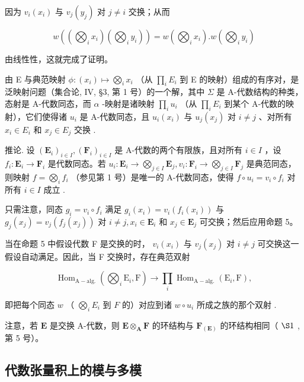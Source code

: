 因为 \(v_{i}(x_{i})\) 与 \(v_{j}(y_{j})\) 对 \(j \neq i\) 交换；从而

\[
w \left(\left(\bigotimes_ {i} x _ {i}\right) \left(\bigotimes_ {i} y _ {i}\right)\right) = w \left(\bigotimes_ {i} x _ {i}\right). w \left(\bigotimes_ {i} y _ {i}\right)
\]

由线性性，这就完成了证明。

由 E 与典范映射 \(\phi: (x_i) \mapsto \bigotimes_i x_i\) （从 \(\prod_i E_i\) 到 E 的映射）组成的有序对，是泛映射问题（集合论, IV, §3, 第 1 号）的一个解，其中 \(\Sigma\) 是 A-代数结构的种类，态射是 A-代数同态，而 \(\alpha\) -映射是诸映射 \(\prod_i u_i\) （从 \(\prod_i E_i\) 到某个 A-代数的映射），它们使得诸 \(u_i\) 是 A-代数同态，且 \(u_i(x_i)\) 与 \(u_j(x_j)\) 对 \(i \neq j\) 、对所有 \(x_i \in E_i\) 和 \(x_j \in E_j\) 交换 .

推论. 设 \((\mathbf{E}_i)_{i\in I}, (\mathbf{F}_i)_{i\in I}\) 是 A-代数的两个有限族，且对所有 \(i\in I\) ，设 \(f_i: \mathbf{E}_i \to \mathbf{F}_i\) 是代数同态。若 \(u_i: \mathbf{E}_i \to \bigotimes_{j\in I} \mathbf{E}_{j}, v_i: \mathbf{F}_i \to \bigotimes_{j\in I} \mathbf{F}_j\) 是典范同态，则映射 \(f = \bigotimes_{i} f_i\) （参见第 1 号）是唯一的 A-代数同态，使得 \(f \circ u_i = v_i \circ f_i\) 对所有 \(i\in I\) 成立 .

只需注意，同态 \(g_{i} = v_{i} \circ f_{i}\) 满足 \(g_{i}(x_{i}) = v_{i}(f_{i}(x_{i}))\) 与 \(g_{j}(x_{j}) = v_{j}(f_{j}(x_{j}))\) 对 \(i \neq j, x_{i} \in \mathbf{E}_{i}\) 和 \(x_{j} \in \mathbf{E}_{j}\) 可交换；然后应用命题 5。

当在命题 5 中假设代数 F 是交换的时， \(v_{i}(x_{i})\) 与 \(v_{j}(x_{j})\) 对 \(i \neq j\) 可交换这一假设自动满足。因此，当 F 交换时，存在典范双射

\[
\operatorname{Hom} _ {\mathrm{A-alg.}} \left(\bigotimes_ {i} \mathrm{E} _ {i}, \mathrm{F}\right)\rightarrow \prod_ {i} \operatorname{Hom} _ {\mathrm{A-alg.}} (\mathrm{E} _ {i}, \mathrm{F}),\tag{6}
\]

即把每个同态 \(w\) （ \(\bigotimes_{i} E_{i}\) 到 \(F\) 的）对应到诸 \(w \circ u_{i}\) 所成之族的那个双射 .

注意，若 \(\mathbf{E}\) 是交换 A-代数，则 \(\mathbf{E} \otimes_{\mathbf{A}} \mathbf{F}\) 的环结构与 \(\mathbf{F}_{(\mathbf{E})}\) 的环结构相同（ \(\S 1\) , 第 5 号）。

\subsection{代数张量积上的模与多模}

